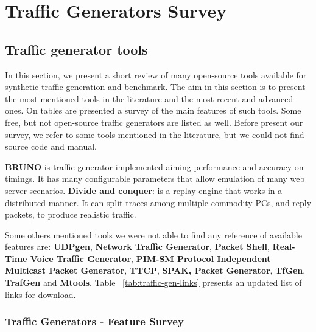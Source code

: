 
\chapter{Traffic Generators Survey}
\label{ap:traffic-gen-survey}


\section{Traffic generator tools}


In this section, we present a short review of many open-source tools available for synthetic traffic generation and benchmark. The aim in this section is to present the most mentioned tools in the literature and the most recent and advanced ones. On tables are presented a survey of the main features of such tools. Some free, but not open-source traffic generators are listed as well. Before present our survey, we refer to some tools mentioned in the literature, but we could not find source code and manual. 

\textbf{BRUNO}\cite{bruno-paper} is traffic generator implemented aiming performance and accuracy on timings. It has many configurable parameters that allow emulation of many web server scenarios. \textbf{Divide and conquer}\cite{validate-trafficgen}: is a replay engine that works in a distributed manner. It can split traces among multiple commodity PCs, and reply packets, to produce realistic traffic. 

Some others mentioned tools \cite{web-ditg} we were not able to find any reference of available features are: \textbf{UDPgen}, \textbf{Network Traffic Generator}, \textbf{Packet Shell}, \textbf{Real-Time Voice Traffic Generator}, \textbf{PIM-SM Protocol Independent Multicast Packet Generator}, \textbf{TTCP}, \textbf{SPAK, Packet Generator}, \textbf{TfGen}, \textbf{TrafGen} and \textbf{Mtools}. Table ~\ref{tab:traffic-gen-links} presents an updated list of links for download.


\subsection{Traffic Generators - Feature Survey}


